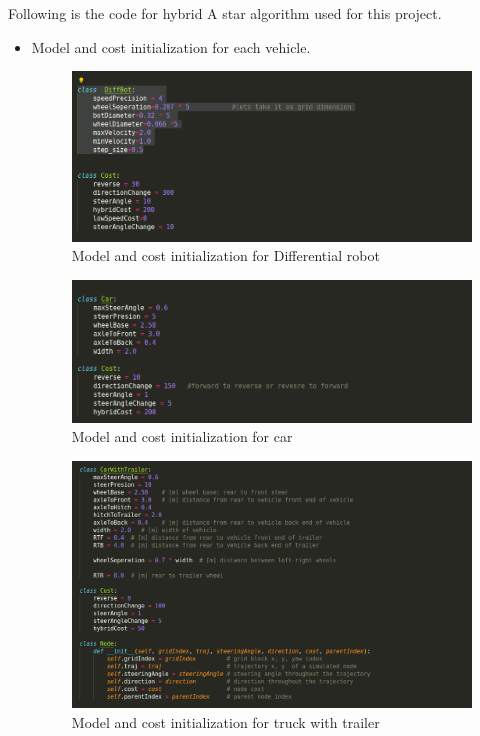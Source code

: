 \documentclass[12pt,a4paper]{article}
\begin{document}
\par
Following is the code for hybrid A star algorithm used for this project.
\begin{itemize}
    \item Model and cost initialization for each vehicle. \par

 
        \begin{figure}[h!]
        \begin{center}
        \includegraphics[width=0.8\columnwidth]{algorithm/diff_model_cost_initialization.png}
        \end{center}
        \caption{Model and cost initialization for Differential robot}
        \label{fig:Hybrid_A-star}
        \end{figure}

        \begin{figure}[h!]
        \begin{center}
        \includegraphics[width=0.8\columnwidth]{algorithm/car_model_cost_initialization.png}
        \end{center}
        \caption{Model and cost initialization for car}
        \label{fig:Hybrid_A-star}
        \end{figure}

        \begin{figure}[h!]
        \begin{center}
        \includegraphics[width=0.8\columnwidth]{algorithm/trailer_model_cost_initialization.png}
        \end{center}
        \caption{Model and cost initialization for truck with trailer}
        \label{fig:Hybrid_A-star}
        \end{figure}


\end{itemize}
\end{document}
